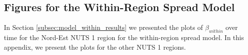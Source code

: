 \documentclass[12pt]{article}
\begin{document}
\begin{appendices}
		
		\newpage
		\subsection{Figures for the Within-Region Spread Model} \label{sapp:figures_model_within}
		In Section \ref{subsec:model_within_results} we presented the plots of $\beta_{within}$ over time for the Nord-Est NUTS 1 region for the within-region spread model. In this appendix, we present the plots for the other NUTS 1 regions. \\
		

\end{appendices}
\end{document}
